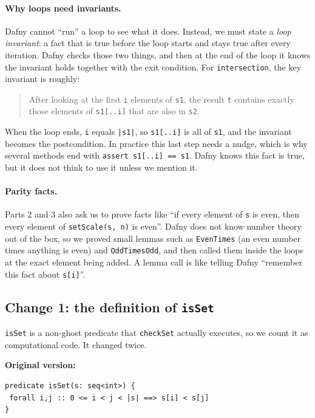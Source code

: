 \documentclass[11pt,a4paper]{article}
\begin{document}
\paragraph{Why loops need invariants.} Dafny cannot ``run'' a loop to see what it does. Instead, we must state a \emph{loop invariant}: a fact that is true before the loop starts and stays true after every iteration. Dafny checks those two things, and then at the end of the loop it knows the invariant holds together with the exit condition. For \texttt{intersection}, the key invariant is roughly:
\begin{quote}
  After looking at the first \texttt{i} elements of \texttt{s1}, the result \texttt{t} contains exactly those elements of \texttt{s1[..i]} that are also in \texttt{s2}.
\end{quote}
When the loop ends, \texttt{i} equals \texttt{|s1|}, so \texttt{s1[..i]} is all of \texttt{s1}, and the invariant becomes the postcondition. In practice this last step needs a nudge, which is why several methods end with \texttt{assert s1[..i] == s1}. Dafny knows this fact is true, but it does not think to use it unless we mention it.

\paragraph{Parity facts.} Parts 2 and 3 also ask us to prove facts like ``if every element of \texttt{s} is even, then every element of \texttt{setScale(s, n)} is even''. Dafny does not know number theory out of the box, so we proved small lemmas such as \texttt{EvenTimes} (an even number times anything is even) and \texttt{OddTimesOdd}, and then called them inside the loops at the exact element being added. A lemma call is like telling Dafny ``remember this fact about \texttt{s[i]}''.

\subsection*{Change 1: the definition of \texttt{isSet}}

\texttt{isSet} is a non-ghost predicate that \texttt{checkSet} actually executes, so we count it as computational code. It changed twice.

\textbf{Original version:}
\begin{lstlisting}
predicate isSet(s: seq<int>) {
 forall i,j :: 0 <= i < j < |s| ==> s[i] < s[j]
}
\end{lstlisting}
\end{document}
